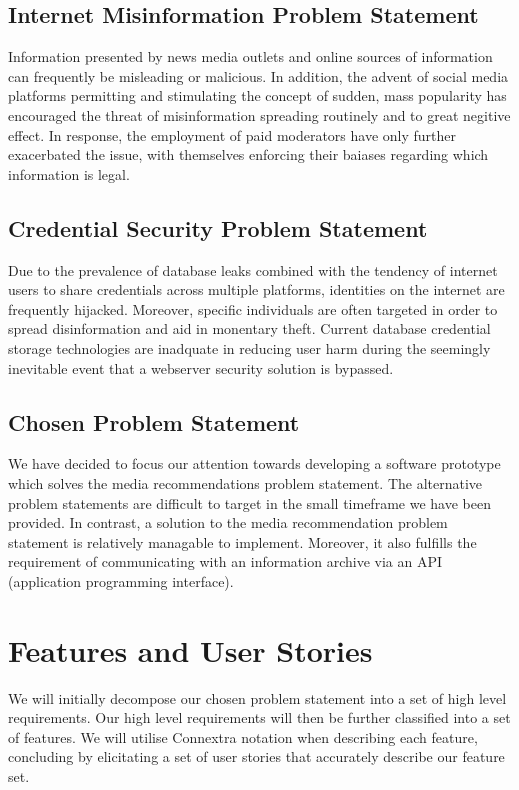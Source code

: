 \documentclass{article}
\begin{document}
\subsection{Internet Misinformation Problem Statement}
Information presented by news media outlets and online sources of information
can frequently be misleading or malicious. In addition, the advent of social
media platforms permitting and stimulating the concept of sudden, mass 
popularity has encouraged the threat of misinformation spreading routinely and
to great negitive effect. In response, the employment of paid moderators have
only further exacerbated the issue, with themselves enforcing their baiases
regarding which information is legal.
\subsection{Credential Security Problem Statement}
Due to the prevalence of database leaks combined with the tendency of internet
users to share credentials across multiple platforms, identities on the internet
are frequently hijacked. Moreover, specific individuals are often targeted in
order to spread disinformation and aid in monentary theft. Current database
credential storage technologies are inadquate in reducing user harm during the
seemingly inevitable event that a webserver security solution is bypassed.
\subsection*{Chosen Problem Statement}
We have decided to focus our attention towards developing a software prototype
which solves the media recommendations problem statement. The alternative 
problem statements are difficult to target in the small timeframe we have been
provided. In contrast, a solution to the media recommendation problem statement 
is relatively managable to implement. Moreover, it also fulfills the requirement
of communicating with an information archive via an API
(application programming interface).

\section{Features and User Stories}
We will initially decompose our chosen problem statement into a set of high
level requirements. Our high level requirements will then be further classified
into a set of features. We will utilise Connextra notation when describing
each feature, concluding by elicitating a set of user stories that accurately
describe our feature set.
\end{document}
